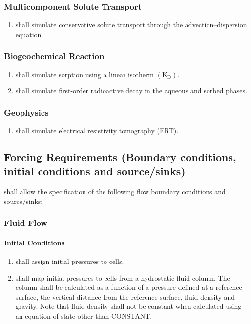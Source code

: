 \subsubsection{Multicomponent Solute Transport}
\begin{enumerate}[resume]
	\item \label{PCTranConservative} \pft shall simulate conservative solute transport through the advection--dispersion equation. 
\end{enumerate}
\subsubsection{Biogeochemical Reaction}
\begin{enumerate}[resume]
	\item \label{PCRxnKD} \pft shall simulate sorption using a linear isotherm $\left(\text{K}_\text{D}\right)$. 
	\item \label{PCRxnKD} \pft shall simulate first-order radioactive decay in the aqueous and sorbed phases. 
\end{enumerate}
\subsubsection{Geophysics}
\begin{enumerate}[resume]
	\item \label{PCERT} \pft shall simulate electrical resistivity tomography (ERT). 
\end{enumerate}

\subsection{Forcing Requirements (Boundary conditions, initial conditions and source/sinks)}
\pft shall allow the specification of the following flow boundary conditions and source/sinks:

\subsubsection{Fluid Flow}
\newcommand{\hydrostatictext}{	The column shall be calculated as a function of a pressure defined at a reference surface, the vertical distance from the reference surface, fluid density and gravity. Note that fluid density shall not be constant when calculated using an equation of state other than CONSTANT.}
\paragraph{Initial Conditions}
\begin{enumerate}
	\item \label{fluidDirichletIC} \pft shall assign initial pressures to cells. 
	\item \label{fluidHydrostaticIC} \pft shall map initial pressures to cells from a hydrostatic fluid column.
	\hydrostatictext
\end{enumerate}

